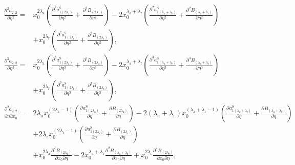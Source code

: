 \documentclass[english]{../thermomemo/thermomemo}
\newcommand*{\pd}[3][]{\frac{\partial^{#1}#2}{\partial{#3}^{#1}}}%
\newcommand*{\pdc}[3]{\frac{\partial^{2}#1}{\partial{#2}\partial{#3}}}%
\newcommand*{\lb}{\left(}
\newcommand*{\rb}{\right)}
\newcommand{\lama}{\ensuremath{{\lambda_{\text{a}}}}\xspace}
\newcommand{\lamr}{\ensuremath{{\lambda_{\text{r}}}}\xspace}
\newcommand*{\aSl}[1]{\ensuremath{a_{1{#1}}^{\text{S}}}\xspace}
\begin{document}
\begin{align}
  \pd[2]{a_{2,2}}{\eta} =& x_0^{2\lama}\lb \pd[2]{\aSl{\lb 2\lama\rb}}{\eta} + \pd[2]{B_{\lb 2\lama\rb}}{\eta}\rb
       -2x_0^{\lama + \lamr}\lb \pd[2]{\aSl{\lb\lama + \lamr\rb}}{\eta}  + \pd[2]{B_{\lb\lama + \lamr\rb}}{\eta}\rb \nonumber \\
                     & + x_0^{2\lamr}\lb \pd[2]{\aSl{\lb 2\lamr\rb}}{\eta} + \pd[2]{B_{\lb 2\lamr\rb}}{\eta}\rb,\\
    \pd[3]{a_{2,2}}{\eta} =& x_0^{2\lama}\lb \pd[3]{\aSl{\lb 2\lama\rb}}{\eta} + \pd[3]{B_{\lb 2\lama\rb}}{\eta}\rb
       -2x_0^{\lama + \lamr}\lb \pd[3]{\aSl{\lb\lama + \lamr\rb}}{\eta}  + \pd[3]{B_{\lb\lama + \lamr\rb}}{\eta}\rb \nonumber \\
  & + x_0^{2\lamr}\lb \pd[3]{\aSl{\lb 2\lamr\rb}}{\eta} + \pd[3]{B_{\lb 2\lamr\rb}}{\eta}\rb,\\
  \pdc{a_{2,2}}{\eta}{x_0} =& 2\lama x_0^{\lb 2\lama - 1\rb}\lb \pd{\aSl{\lb 2\lama\rb}}{\eta} + \pd{B_{\lb 2\lama\rb}}{\eta}\rb
       -2\lb\lama + \lamr\rb x_0^{\lb\lama + \lamr - 1\rb}\lb \pd{\aSl{\lb\lama + \lamr\rb}}{\eta}  + \pd{B_{\lb\lama + \lamr\rb}}{\eta}\rb \nonumber \\&
   + 2\lamr  x_0^{\lb 2\lamr -1 \rb}\lb \pd{\aSl{\lb 2\lamr\rb}}{\eta} + \pd{B_{\lb 2\lamr\rb}}{\eta}\rb \nonumber \\ &+ x_0^{2\lama} \pdc{B_{\lb 2\lama\rb}}{x_0}{\eta}  -2x_0^{\lama + \lamr}\pdc{B_{\lb\lama + \lamr\rb}}{x_0}{\eta}
   + x_0^{2\lamr}\pdc{B_{\lb 2\lamr\rb}}{x_0}{\eta},
\end{align}
\end{document}

